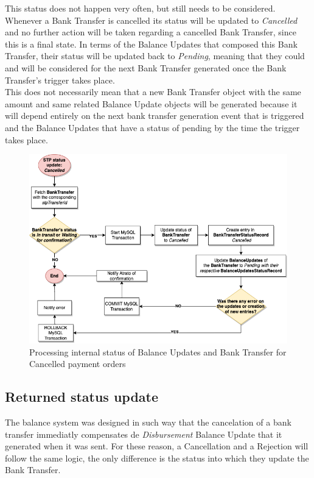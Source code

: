 This status does not happen very often, but still needs to be considered. Whenever a Bank Transfer is cancelled its status will be updated to \textit{Cancelled} and no further action will be taken regarding a cancelled Bank Transfer, since this is a final state. In terms of the Balance Updates that composed this Bank Transfer, their status will be updated back to \textit{Pending}, meaning that they could and will be considered for the next Bank Transfer generated once the Bank Transfer’s trigger takes place.\\

This does not necessarily mean that a new Bank Transfer object with the same amount and same related Balance Update objects will be generated because it will depend entirely on the next bank transfer generation event that is triggered and the Balance Updates that have a status of pending by the time the trigger takes place.

\begin{figure} [H]
    \centering
    \includegraphics[scale = 0.4]{assets/diagrams/CancelledStatusUpdate.png}
    \caption{Processing internal status of Balance Updates and Bank Transfer for Cancelled payment orders}\label{fig:cancelled_status_update}
\end{figure}

\subsection{Returned status update}

The balance system was designed in such way that the cancelation of a bank transfer immediatly compensates de \textit{Disbursement} Balance Update that it generated when it was sent. For these reason, a Cancellation and a Rejection will follow the same logic, the only difference is the status into which they update the Bank Transfer.